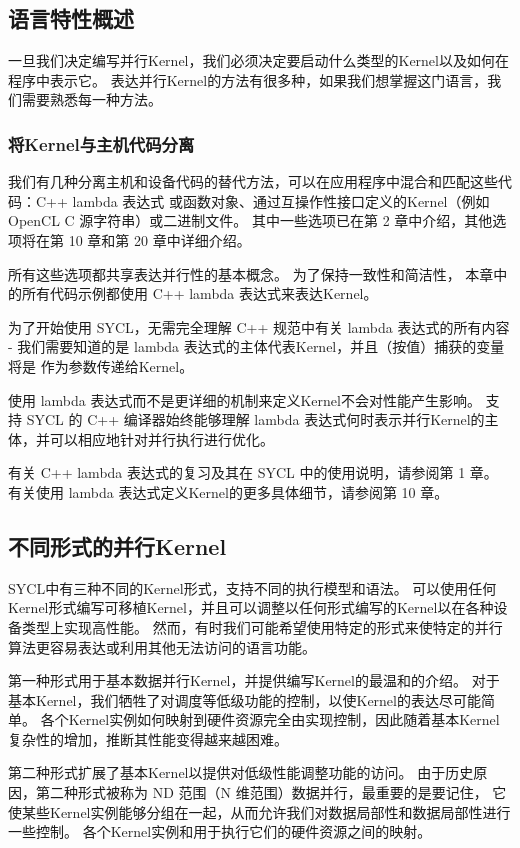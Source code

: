 \subsection{语言特性概述}
一旦我们决定编写并行Kernel，我们必须决定要启动什么类型的Kernel以及如何在程序中表示它。 
表达并行Kernel的方法有很多种，如果我们想掌握这门语言，我们需要熟悉每一种方法。

\subsubsection{将Kernel与主机代码分离}
我们有几种分离主机和设备代码的替代方法，可以在应用程序中混合和匹配这些代码：C++ lambda 表达式
或函数对象、通过互操作性接口定义的Kernel（例如 OpenCL C 源字符串）或二进制文件。 
其中一些选项已在第 2 章中介绍，其他选项将在第 10 章和第 20 章中详细介绍。

所有这些选项都共享表达并行性的基本概念。 为了保持一致性和简洁性，
本章中的所有代码示例都使用 C++ lambda 表达式来表达Kernel。

\begin{remark}
为了开始使用 SYCL，无需完全理解 C++ 规范中有关 lambda 表达式的所有内容 - 
我们需要知道的是 lambda 表达式的主体代表Kernel，并且（按值）捕获的变量将是 作为参数传递给Kernel。

使用 lambda 表达式而不是更详细的机制来定义Kernel不会对性能产生影响。 
支持 SYCL 的 C++ 编译器始终能够理解 lambda 表达式何时表示并行Kernel的主体，并可以相应地针对并行执行进行优化。

有关 C++ lambda 表达式的复习及其在 SYCL 中的使用说明，请参阅第 1 章。
有关使用 lambda 表达式定义Kernel的更多具体细节，请参阅第 10 章。
\end{remark}

\subsection{不同形式的并行Kernel}
SYCL中有三种不同的Kernel形式，支持不同的执行模型和语法。 
可以使用任何Kernel形式编写可移植Kernel，并且可以调整以任何形式编写的Kernel以在各种设备类型上实现高性能。 
然而，有时我们可能希望使用特定的形式来使特定的并行算法更容易表达或利用其他无法访问的语言功能。

第一种形式用于基本数据并行Kernel，并提供编写Kernel的最温和的介绍。 
对于基本Kernel，我们牺牲了对调度等低级功能的控制，以使Kernel的表达尽可能简单。 
各个Kernel实例如何映射到硬件资源完全由实现控制，因此随着基本Kernel复杂性的增加，推断其性能变得越来越困难。

第二种形式扩展了基本Kernel以提供对低级性能调整功能的访问。 
由于历史原因，第二种形式被称为 ND 范围（N 维范围）数据并行，最重要的是要记住，
它使某些Kernel实例能够分组在一起，从而允许我们对数据局部性和数据局部性进行一些控制。 
各个Kernel实例和用于执行它们的硬件资源之间的映射。

